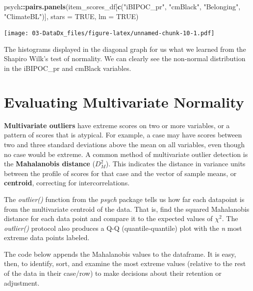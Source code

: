 \documentclass[
  11pt,
]{book}
\newenvironment{Shaded}{\begin{snugshade}}{\end{snugshade}}
\newcommand{\AttributeTok}[1]{\textcolor[rgb]{0.27,0.27,0.27}{#1}}
\newcommand{\ConstantTok}[1]{\textcolor[rgb]{0.37,0.37,0.37}{#1}}
\newcommand{\FunctionTok}[1]{\textcolor[rgb]{0.27,0.27,0.27}{\textbf{#1}}}
\newcommand{\NormalTok}[1]{#1}
\newcommand{\SpecialCharTok}[1]{\textcolor[rgb]{0.43,0.43,0.43}{\textbf{#1}}}
\newcommand{\StringTok}[1]{\textcolor[rgb]{0.5,0.5,0.5}{#1}}
\begin{document}
\begin{Shaded}
\begin{Highlighting}[]
\NormalTok{psych}\SpecialCharTok{::}\FunctionTok{pairs.panels}\NormalTok{(item\_scores\_df[}\FunctionTok{c}\NormalTok{(}\StringTok{"iBIPOC\_pr"}\NormalTok{, }\StringTok{"cmBlack"}\NormalTok{, }\StringTok{"Belonging"}\NormalTok{, }\StringTok{"ClimateBL"}\NormalTok{)], }\AttributeTok{stars =} \ConstantTok{TRUE}\NormalTok{, }\AttributeTok{lm =} \ConstantTok{TRUE}\NormalTok{)}
\end{Highlighting}
\end{Shaded}

\texttt{[image: 03-DataDx\_files/figure-latex/unnamed-chunk-10-1.pdf]}

The histograms displayed in the diagonal graph for us what we learned from the Shapiro Wilk's test of normality. We can clearly see the non-normal distribution in the iBIPOC\_pr and cmBlack variables.

\hypertarget{evaluating-multivariate-normality}{%
\section{Evaluating Multivariate Normality}\label{evaluating-multivariate-normality}}

\textbf{Multivariate outliers} have extreme scores on two or more variables, or a pattern of scores that is atypical. For example, a case may have scores between two and three standard deviations above the mean on all variables, even though no case would be extreme. A common method of multivariate outlier detection is the \textbf{Mahalanobis distance} (\(D_{M}^{2}\)). This indicates the distance in variance units between the profile of scores for that case and the vector of sample means, or \textbf{centroid}, correcting for intercorrelations.

The \emph{outlier()} function from the \emph{psych} package tells us how far each datapoint is from the multivariate centroid of the data. That is, find the squared Mahalanobis distance for each data point and compare it to the expected values of \(\chi^2\). The \emph{outlier()} protocol also produces a Q-Q (quantile-quantile) plot with the \emph{n} most extreme data points labeled.

The code below appends the Mahalanobis values to the dataframe. It is easy, then, to identify, sort, and examine the most extreme values (relative to the rest of the data in their case/row) to make decisions about their retention or adjustment.
\end{document}
